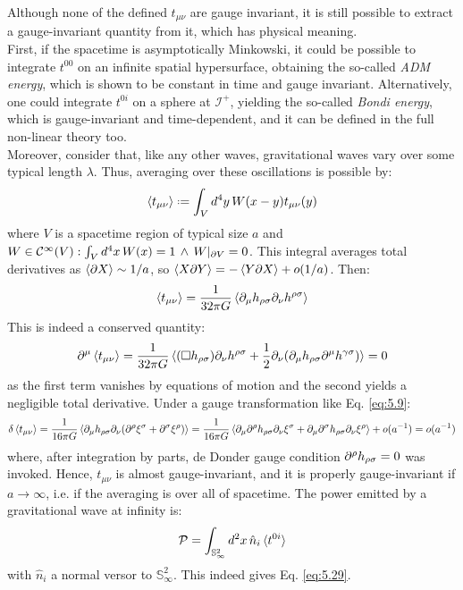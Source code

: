 Although none of the defined $ t_{\mu \nu} $ are gauge invariant, it is still possible to extract a gauge-invariant quantity from it, which has physical meaning.\\
First, if the spacetime is asymptotically Minkowski, it could be possible to integrate $ t^{00} $ on an infinite spatial hypersurface, obtaining the so-called \textit{ADM energy}, which is shown to be constant in time and gauge invariant. Alternatively, one could integrate $ t^{0i} $ on a sphere at $ \mathcal{I}^+ $, yielding the so-called \textit{Bondi energy}, which is gauge-invariant and time-dependent, and it can be defined in the full non-linear theory too.\\
Moreover, consider that, like any other waves, gravitational waves vary over some typical length $ \lambda $. Thus, averaging over these oscillations is possible by:
\begin{equation*}
  \braket{t_{\mu \nu}} \defeq \int_V d^4 y\, W(x - y) t_{\mu \nu}(y)
\end{equation*}
where $ V $ is a spacetime region of typical size $ a $ and $ W \in \mathcal{C}^{\infty}(V) : \int_V d^4 x\, W(x) = 1 \,\land\, W\vert_{\partial V} = 0 $. This integral averages total derivatives as $ \braket{\partial X} \sim 1/a $, so $ \braket{X \partial Y} = - \braket{Y \partial X} + o(1/a) $. Then:
\begin{equation}
  \braket{t_{\mu \nu}} = \frac{1}{32\pi G} \braket{\partial_\mu h_{\rho \sigma} \partial_\nu h^{\rho \sigma}}
  \label{eq:5.31}
\end{equation}
This is indeed a conserved quantity:
\begin{equation*}
  \partial^\mu \braket{t_{\mu \nu}} = \frac{1}{32\pi G} \braket{(\Box h_{\rho \sigma}) \partial_\nu h^{\rho \sigma} + \frac{1}{2} \partial_\nu (\partial_\mu h_{\rho \sigma} \partial^\mu h^{\gamma \sigma})} = 0
\end{equation*}
as the first term vanishes by equations of motion and the second yields a negligible total derivative. Under a gauge transformation like Eq. \ref{eq:5.9}:
\begin{equation*}
  \delta \braket{t_{\mu \nu}} = \frac{1}{16\pi G} \braket{\partial_\mu h_{\rho \sigma} \partial_\nu (\partial^\rho \xi^\sigma + \partial^\sigma \xi^\rho)} = \frac{1}{16\pi G} \braket{\partial_\mu \partial^\rho h_{\rho \sigma} \partial_\nu \xi^\sigma + \partial_\mu \partial^\sigma h_{\rho \sigma} \partial_\nu \xi^\rho} + o(a^{-1}) = o(a^{-1})
\end{equation*}
where, after integration by parts, de Donder gauge condition $ \partial^\rho h_{\rho \sigma} = 0 $ was invoked. Hence, $ t_{\mu \nu} $ is almost gauge-invariant, and it is properly gauge-invariant if $ a \rightarrow \infty $, i.e. if the averaging is over all of spacetime. The power emitted by a gravitational wave at infinity is:
\begin{equation*}
  \mathcal{P} = \int_{\mathbb{S}^2_{\infty}} d^2 x\, \hat{n}_i \braket{t^{0i}}
\end{equation*}
with $ \hat{n}_i $ a normal versor to $ \mathbb{S}^2_{\infty} $. This indeed gives Eq. \ref{eq:5.29}.

